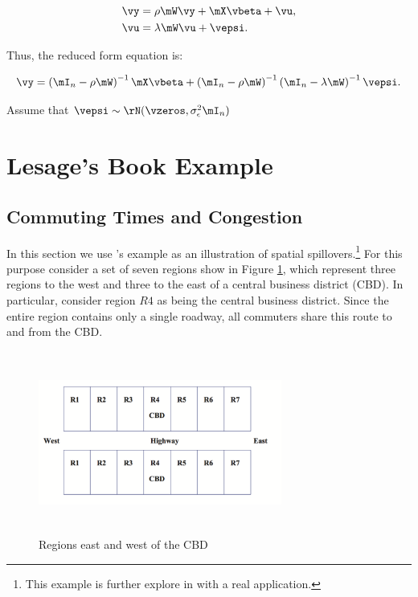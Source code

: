 \documentclass[english,12pt]{book}\usepackage[]{graphicx}\usepackage[]{xcolor}
\begin{document}
\begin{equation}
  \begin{aligned}
    \vy & = \rho\mW\vy + \mX\vbeta + \vu, \\
    \vu & = \lambda\mW\vu + \vepsi. 
  \end{aligned}
\end{equation}

Thus, the reduced form equation is:

\begin{equation}
\vy = \left(\mI_n -\rho \mW\right)^{-1}\mX\vbeta + \left(\mI_n -\rho \mW\right)^{-1}\left(\mI_n -\lambda \mW\right)^{-1}\vepsi. \\
\end{equation}

Assume that $\vepsi\sim\rN(\vzeros, \sigma^2_{\epsilon}\mI_n)$


\section{Lesage's Book Example}\label{sec:lesage-example}

\subsection{Commuting Times and Congestion}

In this section we use \cite{lesage2010introduction}'s example as an illustration of spatial spillovers.\footnote{This example is further explore in \cite{kirby2009changes} with a real application.} For this purpose consider a set of seven regions show in Figure \ref{fig:lesage-example}, which represent three regions to the west and three to the east of a central business district (CBD). In particular, consider region $R4$ as being the central business district. Since the entire region contains only a single roadway, all commuters share this route to and from the CBD.


\begin{figure}[ht]
\caption{Regions east and west of the CBD}\label{fig:lesage-example}
		    \centering 
		      \includegraphics[width = 8cm, height=6cm]{figure/lesage.png}
\end{figure}
\end{document}
